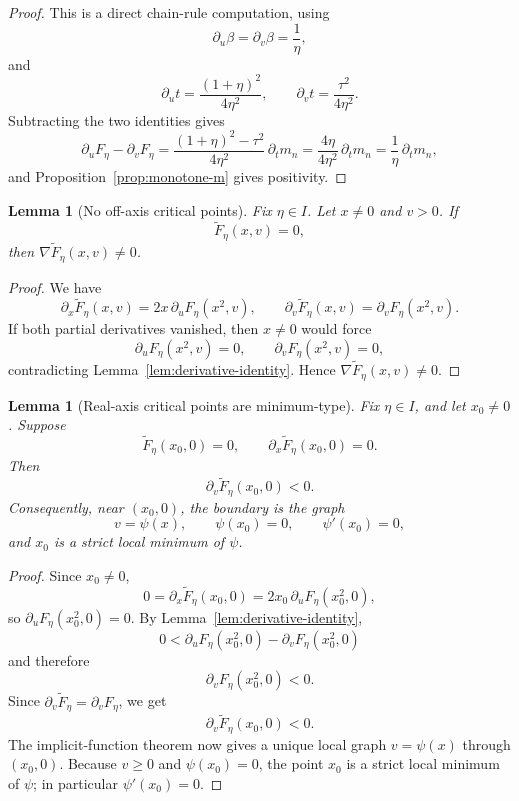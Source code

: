\documentclass[11pt]{article}
\newtheorem{lemma}[theorem]{Lemma}
\begin{document}
\begin{proof}
This is a direct chain-rule computation, using
\[
\partial_u \beta=\partial_v \beta=\frac1\eta,
\]
and
\[
\partial_u t=\frac{(1+\eta)^2}{4\eta^2},
\qquad
\partial_v t=\frac{\tau^2}{4\eta^2}.
\]
Subtracting the two identities gives
\[
\partial_u F_\eta-\partial_v F_\eta
=
\frac{(1+\eta)^2-\tau^2}{4\eta^2}\,\partial_t m_n
=
\frac{4\eta}{4\eta^2}\,\partial_t m_n
=
\frac1\eta\,\partial_t m_n,
\]
and Proposition~\ref{prop:monotone-m} gives positivity.
\end{proof}

\begin{lemma}[No off-axis critical points]\label{lem:no-off-axis-critical}
Fix \(\eta\in I\).  Let \(x\neq0\) and \(v>0\).  If
\[
\widetilde F_\eta(x,v)=0,
\]
then \(\nabla \widetilde F_\eta(x,v)\neq0\).
\end{lemma}

\begin{proof}
We have
\[
\partial_x \widetilde F_\eta(x,v)=2x\,\partial_u F_\eta(x^2,v),
\qquad
\partial_v \widetilde F_\eta(x,v)=\partial_v F_\eta(x^2,v).
\]
If both partial derivatives vanished, then \(x\neq0\) would force
\[
\partial_u F_\eta(x^2,v)=0,
\qquad
\partial_v F_\eta(x^2,v)=0,
\]
contradicting Lemma~\ref{lem:derivative-identity}.  Hence \(\nabla\widetilde F_\eta(x,v)\neq0\).
\end{proof}

\begin{lemma}[Real-axis critical points are minimum-type]\label{lem:real-axis-minimum}
Fix \(\eta\in I\), and let \(x_0\neq0\). Suppose
\[
\widetilde F_\eta(x_0,0)=0,
\qquad
\partial_x\widetilde F_\eta(x_0,0)=0.
\]
Then
\[
\partial_v \widetilde F_\eta(x_0,0)<0.
\]
Consequently, near \((x_0,0)\), the boundary is the graph
\[
v=\psi(x),
\qquad
\psi(x_0)=0,\qquad \psi'(x_0)=0,
\]
and \(x_0\) is a strict local minimum of \(\psi\).
\end{lemma}

\begin{proof}
Since \(x_0\neq0\),
\[
0=\partial_x\widetilde F_\eta(x_0,0)=2x_0\,\partial_uF_\eta(x_0^2,0),
\]
so \(\partial_uF_\eta(x_0^2,0)=0\). By Lemma~\ref{lem:derivative-identity},
\[
0<\partial_uF_\eta(x_0^2,0)-\partial_vF_\eta(x_0^2,0)
\]
and therefore
\[
\partial_vF_\eta(x_0^2,0)<0.
\]
Since \(\partial_v\widetilde F_\eta=\partial_vF_\eta\), we get
\[
\partial_v\widetilde F_\eta(x_0,0)<0.
\]
The implicit-function theorem now gives a unique local graph \(v=\psi(x)\) through \((x_0,0)\). Because \(v\ge0\) and \(\psi(x_0)=0\), the point \(x_0\) is a strict local minimum of \(\psi\); in particular \(\psi'(x_0)=0\).
\end{proof}
\end{document}
